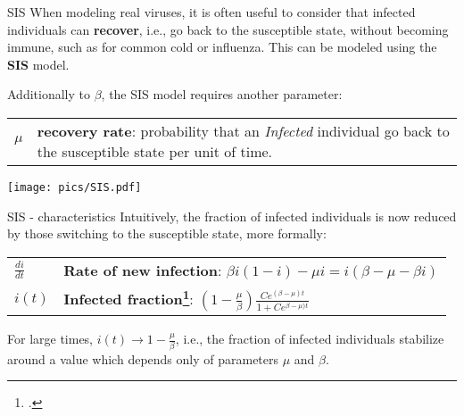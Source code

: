 \begin{textbox}{SIS}
    When modeling real viruses, it is often useful to consider that infected individuals can \textbf{recover}, i.e., go back to the susceptible state, without becoming immune, such as for common cold or influenza. This can be modeled using the \textbf{SIS} model.

    Additionally to $\beta$, the SIS model requires another parameter:

    \begin{tabular}{p{}|p{}}\scriptsize

        $\mu$ & \textbf{recovery rate}: probability that an \textit{Infected} individual go back to the susceptible state per unit of time.
    \end{tabular}
    \centering
    \vspace{0.3cm}
    \texttt{[image: pics/SIS.pdf]}
\end{textbox}


\begin{textbox}{SIS - characteristics}
    Intuitively, the fraction of infected individuals is now reduced by those switching to the susceptible state, more formally:

    \begin{tabular}{p{}|p{}}\scriptsize

        $\frac{di}{dt}$ & \textbf{Rate of new infection}: $\beta i(1-i) - \mu i=i(\beta - \mu - \beta i)$                                                             \\

        $i(t)$          & \textbf{Infected fraction\footcite{barrat2008dynamical}}: $\left( 1-\frac{\mu}{\beta }\right) \frac{Ce^{(\beta-\mu)t}}{1+Ce^{\beta-\mu)t}}$ \\
    \end{tabular}

    For large times, $i(t)\to 1-\frac{\mu}{\beta}$, i.e., the fraction of infected individuals stabilize around a value which depends only of parameters $\mu$ and $\beta$.

\end{textbox}


